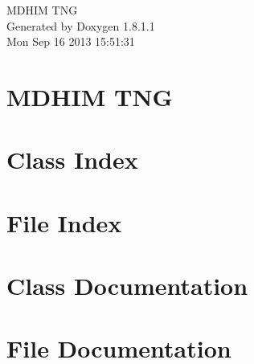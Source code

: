 \documentclass{book}
\begin{document}
\hypersetup{pageanchor=false,citecolor=blue}
\begin{titlepage}
\vspace*{7cm}
\begin{center}
{\Large M\-D\-H\-I\-M T\-N\-G }\\
\vspace*{1cm}
{\large Generated by Doxygen 1.8.1.1}\\
\vspace*{0.5cm}
{\small Mon Sep 16 2013 15:51:31}\\
\end{center}
\end{titlepage}
\clearemptydoublepage
{}
\tableofcontents
\clearemptydoublepage
{}
\hypersetup{pageanchor=true,citecolor=blue}
\chapter{M\-D\-H\-I\-M T\-N\-G}
\label{index}\hypertarget{index}{}
\chapter{Class Index}

\chapter{File Index}

\chapter{Class Documentation}

























\chapter{File Documentation}




















\printindex
\end{document}
